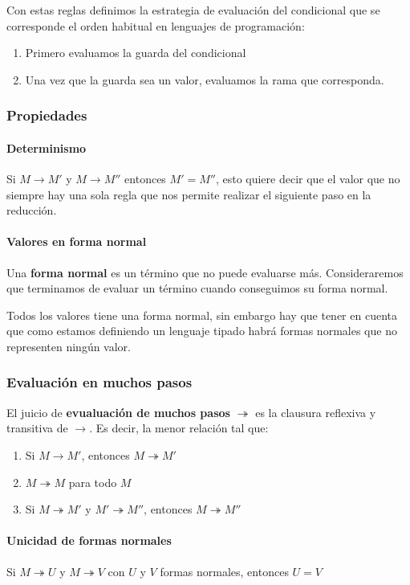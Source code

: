 Con estas reglas definimos la estrategia de evaluación del condicional que se corresponde el orden habitual en lenguajes de programación:
\begin{enumerate}
	\item Primero evaluamos la guarda del condicional
	\item Una vez que la guarda sea un valor, evaluamos la rama que corresponda.
\end{enumerate}

\subsubsection{Propiedades}

\paragraph{Determinismo} Si $M\to M'$ y $M\to M''$ entonces $M' = M''$, esto quiere decir que el valor que no siempre hay una sola regla que nos permite realizar el siguiente paso en la reducción.

\paragraph{Valores en forma normal} Una \textbf{forma normal} es un término que no puede evaluarse más. Consideraremos que terminamos de evaluar un término cuando conseguimos su forma normal.

Todos los valores tiene una forma normal, sin embargo hay que tener en cuenta que como estamos definiendo un lenguaje tipado habrá formas normales que no representen ningún valor.

\subsubsection{Evaluación en muchos pasos}
El juicio de \textbf{evualuación de muchos pasos} $\twoheadrightarrow$ es la clausura reflexiva y transitiva de $\to$. Es decir, la menor relación tal que:
\begin{enumerate}
	\item Si $M\to M'$, entonces $M\twoheadrightarrow M'$
	\item $M\twoheadrightarrow M$ para todo $M$
	\item Si $M\twoheadrightarrow M'$ y $M' \twoheadrightarrow M''$, entonces $M\twoheadrightarrow M''$
\end{enumerate}

\paragraph{Unicidad de formas normales} Si $M\twoheadrightarrow U$ y $M\twoheadrightarrow V$ con $U$ y $V$ formas normales, entonces $U = V$


